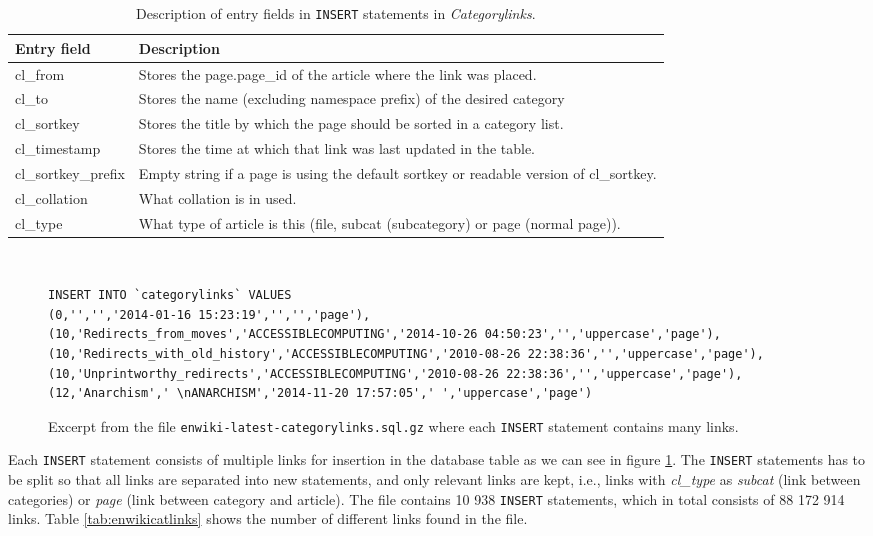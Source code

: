 \begin{table}[h]
\renewcommand{\arraystretch}{1.25}
\begin{tabularx}{\textwidth}{l|X}
\textbf{Entry field} &  \textbf{Description} \\ \hline
cl\_from & Stores the page.page\_id of the article where the link was placed. \\ \hline
cl\_to & Stores the name (excluding namespace prefix) of the desired category \\  \hline
cl\_sortkey & Stores the title by which the page should be sorted in a category list. \\ \hline
cl\_timestamp & Stores the time at which that link was last updated in the table. \\ \hline
cl\_sortkey\_prefix & Empty string if a page is using the default sortkey or readable version of cl\_sortkey. \\ \hline
cl\_collation & What collation is in used. \\ \hline
cl\_type & What type of article is this (file, subcat (subcategory) or page (normal page)).
\end{tabularx}
\\[10pt]
\caption[Description of entry fields in \emph{Categorylinks}]{Description of entry fields in \texttt{INSERT} statements in \emph{Categorylinks}.}
\label{tab:insertdescription}
\end{table}


\begin{figure}[h]
\begin{lstlisting}
INSERT INTO `categorylinks` VALUES 
(0,'','','2014-01-16 15:23:19','','','page'),
(10,'Redirects_from_moves','ACCESSIBLECOMPUTING','2014-10-26 04:50:23','','uppercase','page'),
(10,'Redirects_with_old_history','ACCESSIBLECOMPUTING','2010-08-26 22:38:36','','uppercase','page'),
(10,'Unprintworthy_redirects','ACCESSIBLECOMPUTING','2010-08-26 22:38:36','','uppercase','page'),
(12,'Anarchism',' \nANARCHISM','2014-11-20 17:57:05',' ','uppercase','page')
\end{lstlisting}
\caption[Excerpt from \texttt{enwiki-latest-categorylinks.sql.gz}]{Excerpt from the file \texttt{enwiki-latest-categorylinks.sql.gz} where each \texttt{INSERT} statement contains many links.}
\label{fig:categorylinks}
\end{figure}

Each \texttt{INSERT} statement consists of multiple links for insertion in the database table as we can see in figure \ref{fig:categorylinks}. The \texttt{INSERT} statements has to be split so that all links are separated into new statements, and only relevant links are kept, i.e.,  links with \emph{cl\_type} as \emph{subcat} (link between categories) or \emph{page} (link between category and article). The file \enwikicatlink contains 10 938 \texttt{INSERT} statements, which in total consists of 88 172 914 links. Table \ref{tab:enwikicatlinks} shows the number of different links found in the file. 

